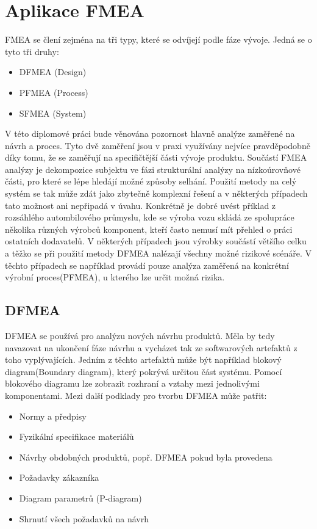 \section{Aplikace FMEA}
FMEA se člení zejména na tři typy, které se odvíjejí podle fáze vývoje. Jedná se o tyto tři druhy: 

\begin{itemize}
	\item  DFMEA (Design)
	\item  PFMEA (Process)
	\item  SFMEA (System)
\end{itemize}
V této diplomové práci bude věnována pozornost hlavně analýze zaměřené na návrh a proces. Tyto dvě zaměření jsou v praxi využívány nejvíce pravděpodobně díky tomu, že se zaměřují na specifičtější části vývoje produktu. Součástí FMEA analýzy je dekompozice subjektu ve fázi strukturální analýzy na nízkoúrovňové části, pro které se lépe hledájí možné způsoby selhání. Použití metody na celý systém se tak může zdát jako zbytečně komplexní řešení a v některých případech tato možnost ani nepřipadá v úvahu. Konkrétně je dobré uvést příklad z rozsáhlého autombilového průmyslu, kde se výroba vozu skládá ze spolupráce několika různých výrobců komponent, kteří často nemusí mít přehled o práci ostatních dodavatelů. V některých případech jsou výrobky součástí většího celku a těžko se při použití metody DFMEA nalézají všechny možné rizikové scénáře. V těchto případech se například provádí pouze analýza zaměřená na konkrétní výrobní proces(PFMEA), u kterého lze určit možná rizika. 

\subsection{DFMEA}
DFMEA se používá pro analýzu nových návrhu produktů. Měla by tedy navazovat na ukončení fáze návrhu a vycházet tak ze softwarových artefaktů z toho vyplývajících. Jedním z těchto artefaktů může být například blokový diagram(Boundary diagram), který pokrývá určitou část systému. Pomocí blokového diagramu lze zobrazit rozhraní a vztahy mezi jednolivými komponentami. Mezi další podklady pro tvorbu DFMEA může patřit: 
\begin{itemize}
	\item  Normy a předpisy
	\item  Fyzikální specifikace materiálů
	\item  Návrhy obdobných produktů, popř. DFMEA pokud byla provedena
	\item  Požadavky zákazníka
	\item  Diagram parametrů (P-diagram)
	\item  Shrnutí všech požadavků na návrh
	
\end{itemize}

